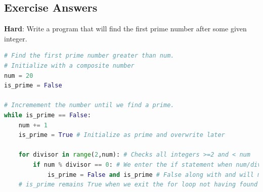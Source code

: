 \subsection{Exercise Answers}


\textbf{Hard}: Write a program that will find the first prime number after some given integer.

\begin{lstlisting}[language = Python]
# Find the first prime number greater than num.
# Initialize with a composite number
num = 20
is_prime = False

# Incremement the number until we find a prime.
while is_prime == False:
    num += 1
    is_prime = True # Initialize as prime and overwrite later
    
    for divisor in range(2,num): # Checks all integers >=2 and < num 
        if num % divisor == 0: # We enter the if statement when num/divisor is a whole number
            is_prime = False and is_prime # False along with and will make the whole boolean False
    # is_prime remains True when we exit the for loop not having found a single divisor \end{lstlisting}